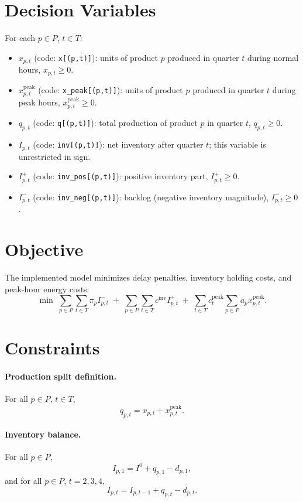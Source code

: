 \section*{Decision Variables}

For each \(p\in P\), \(t\in T\):

\begin{itemize}
    \item \(x_{p,t}\) (code: \texttt{x[(p,t)]}): units of product \(p\) produced in quarter \(t\) during normal hours, \(x_{p,t}\ge 0\).
    \item \(x^{\mathrm{peak}}_{p,t}\) (code: \texttt{x\_peak[(p,t)]}): units of product \(p\) produced in quarter \(t\) during peak hours, \(x^{\mathrm{peak}}_{p,t}\ge 0\).
    \item \(q_{p,t}\) (code: \texttt{q[(p,t)]}): total production of product \(p\) in quarter \(t\), \(q_{p,t}\ge 0\).
    \item \(I_{p,t}\) (code: \texttt{inv[(p,t)]}): net inventory after quarter \(t\); this variable is unrestricted in sign.
    \item \(I^+_{p,t}\) (code: \texttt{inv\_pos[(p,t)]}): positive inventory part, \(I^+_{p,t}\ge 0\).
    \item \(I^-_{p,t}\) (code: \texttt{inv\_neg[(p,t)]}): backlog (negative inventory magnitude), \(I^-_{p,t}\ge 0\).
\end{itemize}

\section*{Objective}

The implemented model minimizes delay penalties, inventory holding costs, and peak-hour energy costs:
\[
\min \;
\sum_{p\in P}\sum_{t\in T} \pi_p I^-_{p,t}
\;+\;
\sum_{p\in P}\sum_{t\in T} c^{\mathrm{inv}} I^+_{p,t}
\;+\;
\sum_{t\in T} c_t^{\mathrm{peak}} \sum_{p\in P} a_p x^{\mathrm{peak}}_{p,t}.
\]

\section*{Constraints}

\paragraph{Production split definition.}
For all \(p\in P\), \(t\in T\),
\[
q_{p,t}=x_{p,t}+x^{\mathrm{peak}}_{p,t}.
\]

\paragraph{Inventory balance.}
For all \(p\in P\),
\[
I_{p,1}=I^0+q_{p,1}-d_{p,1},
\]
and for all \(p\in P\), \(t=2,3,4\),
\[
I_{p,t}=I_{p,t-1}+q_{p,t}-d_{p,t}.
\]

